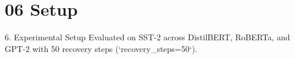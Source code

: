 \section{06 Setup}

 6. Experimental Setup
Evaluated on SST-2 across DistilBERT, RoBERTa, and GPT-2 with 50 recovery steps (`recovery\_steps=50`).
